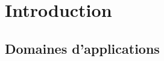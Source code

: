 \documentclass[main.tex]{subfiles}
\begin{document}
\section{Introduction}
\subsection{Domaines d'applications}



\end{document}
